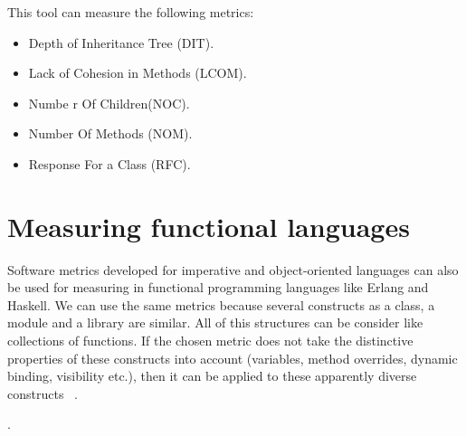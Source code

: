 This tool can measure the following metrics:
\begin{itemize}
	\item Depth of Inheritance Tree (DIT).
	\item Lack of Cohesion in Methods (LCOM).
	\item Numbe r Of Children(NOC).
	\item Number Of Methods (NOM).
	\item Response For a Class (RFC).
\end{itemize}

\section{Measuring functional languages}

Software metrics developed for imperative and object-oriented languages can also be used for measuring in functional programming languages like Erlang and Haskell. We can use the same metrics because several constructs as a class,  a module and a library are similar. All of this structures can be consider like collections of functions. If the chosen metric does not take the distinctive properties of these constructs into account (variables, method overrides, dynamic binding, visibility etc.), then it can be applied to these apparently diverse constructs ~\cite{metrics3}.



.

